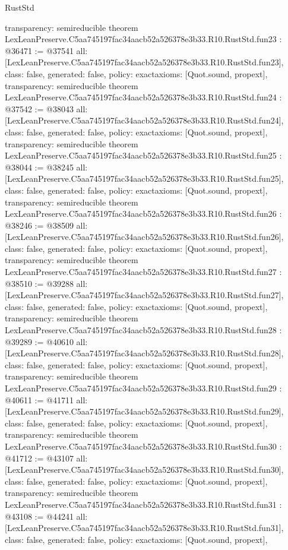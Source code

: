 \begin{lexlean}{RustStd}
\begin{coremodule}
{  transparency: semireducible
}
theorem LexLeanPreserve.C5aa745197fac34aacb52a526378e3b33.R10.RustStd.fun23 : @36471 := @37541 {
  all: [LexLeanPreserve.C5aa745197fac34aacb52a526378e3b33.R10.RustStd.fun23],
  class: false,
  generated: false,
  policy: exact{axioms: [Quot.sound, propext]},
  transparency: semireducible
}
theorem LexLeanPreserve.C5aa745197fac34aacb52a526378e3b33.R10.RustStd.fun24 : @37542 := @38043 {
  all: [LexLeanPreserve.C5aa745197fac34aacb52a526378e3b33.R10.RustStd.fun24],
  class: false,
  generated: false,
  policy: exact{axioms: [Quot.sound, propext]},
  transparency: semireducible
}
theorem LexLeanPreserve.C5aa745197fac34aacb52a526378e3b33.R10.RustStd.fun25 : @38044 := @38245 {
  all: [LexLeanPreserve.C5aa745197fac34aacb52a526378e3b33.R10.RustStd.fun25],
  class: false,
  generated: false,
  policy: exact{axioms: [Quot.sound, propext]},
  transparency: semireducible
}
theorem LexLeanPreserve.C5aa745197fac34aacb52a526378e3b33.R10.RustStd.fun26 : @38246 := @38509 {
  all: [LexLeanPreserve.C5aa745197fac34aacb52a526378e3b33.R10.RustStd.fun26],
  class: false,
  generated: false,
  policy: exact{axioms: [Quot.sound, propext]},
  transparency: semireducible
}
theorem LexLeanPreserve.C5aa745197fac34aacb52a526378e3b33.R10.RustStd.fun27 : @38510 := @39288 {
  all: [LexLeanPreserve.C5aa745197fac34aacb52a526378e3b33.R10.RustStd.fun27],
  class: false,
  generated: false,
  policy: exact{axioms: [Quot.sound, propext]},
  transparency: semireducible
}
theorem LexLeanPreserve.C5aa745197fac34aacb52a526378e3b33.R10.RustStd.fun28 : @39289 := @40610 {
  all: [LexLeanPreserve.C5aa745197fac34aacb52a526378e3b33.R10.RustStd.fun28],
  class: false,
  generated: false,
  policy: exact{axioms: [Quot.sound, propext]},
  transparency: semireducible
}
theorem LexLeanPreserve.C5aa745197fac34aacb52a526378e3b33.R10.RustStd.fun29 : @40611 := @41711 {
  all: [LexLeanPreserve.C5aa745197fac34aacb52a526378e3b33.R10.RustStd.fun29],
  class: false,
  generated: false,
  policy: exact{axioms: [Quot.sound, propext]},
  transparency: semireducible
}
theorem LexLeanPreserve.C5aa745197fac34aacb52a526378e3b33.R10.RustStd.fun30 : @41712 := @43107 {
  all: [LexLeanPreserve.C5aa745197fac34aacb52a526378e3b33.R10.RustStd.fun30],
  class: false,
  generated: false,
  policy: exact{axioms: [Quot.sound, propext]},
  transparency: semireducible
}
theorem LexLeanPreserve.C5aa745197fac34aacb52a526378e3b33.R10.RustStd.fun31 : @43108 := @44241 {
  all: [LexLeanPreserve.C5aa745197fac34aacb52a526378e3b33.R10.RustStd.fun31],
  class: false,
  generated: false,
  policy: exact{axioms: [Quot.sound, propext]},
}
\end{coremodule}
\end{lexlean}
